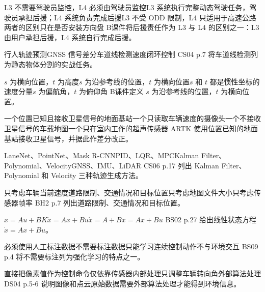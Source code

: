 
{L3 不需要驾驶员监控，L4 必须由驾驶员监控}{L3 系统执行完整动态驾驶任务，驾驶员承担后援；L4 系统负责完成后援}{L3 不受 ODD 限制，L4 只适用于高速公路}{两者的区别只在是否安装方向盘}
{B}{课件将后援责任作为 L3 与 L4 的区别之一：L3 由用户承担后援，L4 系统自行完成后援。}

{行人轨迹预测}{GNSS 信号差分}{车道线检测}{速度闭环控制}
{C}{S04 p.7 将车道线检测列为静态物体分割的实战任务。}

{$s$ 为横向位置，$t$ 为高度}{$s$ 为沿参考线的位置，$t$ 为横向位置}{$s$ 和 $t$ 都是惯性坐标的速度分量}{$s$ 为偏航角，$t$ 为俯仰角}
{B}{课件定义 $s$ 为沿参考线的位置，$t$ 为横向位置。}

{一个位置已知且接收卫星信号的地面基站}{一个只读取车辆速度的摄像头}{一个不接收卫星信号的车载地图}{一个只在室内工作的超声传感器}
{A}{RTK 使用位置已知的地面基站接收卫星信号，并据此作差分改正。}

{LaneNet、PointNet、Mask R-CNN}{PID、LQR、MPC}{Kalman Filter、Polynomial、Velocity}{GNSS、IMU、LiDAR}
{C}{S06 p.17 列出 Kalman Filter、Polynomial 和 Velocity 三种轨迹生成方法。}

{只考虑车辆当前速度}{道路限制、交通情况和目标位置}{只考虑地图文件大小}{只考虑传感器帧率}
{B}{H2 p.7 列出道路限制、交通情况和目标位置。}

{$x=Au+BK$}{$\dot{x}=Ax+Bu$}{$\dot{x}=A+B$}{$x=Ax+Bu$}
{B}{S02 p.27 给出线性状态方程 $\dot{x}=Ax+Bu$。}

{必须使用人工标注数据}{不需要标注数据}{只能学习连续控制动作}{不与环境交互}
{B}{S09 p.4 将不需要标注列为强化学习的特点之一。}

{直接把像素值作为控制命令}{仅依靠传感器内部处理}{只调整车辆转向角}{外部算法处理}
{D}{S04 p.5-6 说明图像和点云原始数据需要外部算法处理才能得到环境信息。}

